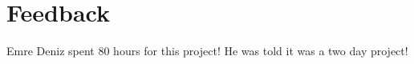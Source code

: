 \section{Feedback}

Emre Deniz spent 80 hours for this project! He was told it was a two day project!

